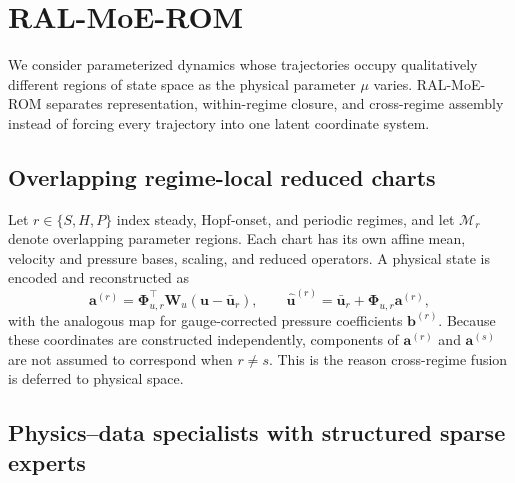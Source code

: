 \section{RAL-MoE-ROM}
\label{sec:method}

We consider parameterized dynamics whose trajectories occupy qualitatively different regions of state space as the physical parameter $\mu$ varies. RAL-MoE-ROM separates representation, within-regime closure, and cross-regime assembly instead of forcing every trajectory into one latent coordinate system.

\subsection{Overlapping regime-local reduced charts}

Let $r\in\{S,H,P\}$ index steady, Hopf-onset, and periodic regimes, and let $\mathcal M_r$ denote overlapping parameter regions. Each chart has its own affine mean, velocity and pressure bases, scaling, and reduced operators. A physical state is encoded and reconstructed as
\begin{equation}
  \bm a^{(r)}=\bm\Phi_{u,r}^{\top}\bm W_u(\bm u-\bar{\bm u}_r),\qquad
  \widehat{\bm u}^{(r)}=\bar{\bm u}_r+\bm\Phi_{u,r}\bm a^{(r)},
  \label{eq:main_chart}
\end{equation}
with the analogous map for gauge-corrected pressure coefficients $\bm b^{(r)}$. Because these coordinates are constructed independently, components of $\bm a^{(r)}$ and $\bm a^{(s)}$ are not assumed to correspond when $r\neq s$. This is the reason cross-regime fusion is deferred to physical space.

\subsection{Physics--data specialists with structured sparse experts}

